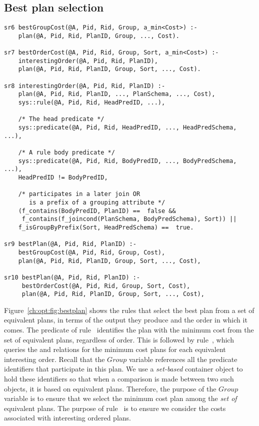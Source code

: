 \subsection{Best plan selection}
\label{ch:opt:sec:bestplan}

\begin{figure*}
\ssp
\centering
\begin{lstlisting}
sr6 bestGroupCost(@A, Pid, Rid, Group, a_min<Cost>) :-
    plan(@A, Pid, Rid, PlanID, Group, ..., Cost).

sr7 bestOrderCost(@A, Pid, Rid, Group, Sort, a_min<Cost>) :-
    interestingOrder(@A, Pid, Rid, PlanID),
    plan(@A, Pid, Rid, PlanID, Group, Sort, ..., Cost).

sr8 interestingOrder(@A, Pid, Rid, PlanID) :-
    plan(@A, Pid, Rid, PlanID, ..., PlanSchema, ..., Cost),
    sys::rule(@A, Pid, Rid, HeadPredID, ...),

    /* The head predicate */
    sys::predicate(@A, Pid, Rid, HeadPredID, ..., HeadPredSchema, ...),

    /* A rule body predicate */
    sys::predicate(@A, Pid, Rid, BodyPredID, ..., BodyPredSchema, ...),
    HeadPredID != BodyPredID,

    /* participates in a later join OR 
       is a prefix of a grouping attribute */
    (f_contains(BodyPredID, PlanID) ==  false && 
     f_contains(f_joincond(PlanSchema, BodyPredSchema), Sort)) ||
    f_isGroupByPrefix(Sort, HeadPredSchema) ==  true.

sr9 bestPlan(@A, Pid, Rid, PlanID) :-
    bestGroupCost(@A, Pid, Rid, Group, Cost),
    plan(@A, Pid, Rid, PlanID, Group, Sort, ..., Cost),

sr10 bestPlan(@A, Pid, Rid, PlanID) :-
     bestOrderCost(@A, Pid, Rid, Group, Sort, Cost),
     plan(@A, Pid, Rid, PlanID, Group, Sort, ..., Cost),
\end{lstlisting}
\caption{\label{ch:opt:fig:bestplan}Best plan selection.}
\end{figure*}

Figure~\ref{ch:opt:fig:bestplan} shows the rules that select the best plan from
a set of equivalent plans, in terms of the output they produce and the order in
which it comes.  The  predicate of rule~ identifies
the plan with the minimum cost from the set of equivalent plans, regardless of
order.  This is followed by rule~, which queries the  and
 relations for the minimum cost plans for each equivalent
interesting order.  Recall that the $Group$ variable references all the
predicate identifiers that participate in this plan.  We use a {\em set-based}
container object to hold these identifiers so that when a comparison is made
between two such objects, it is based on equivalent plans.  Therefore, the
purpose of the $Group$ variable is to ensure that we select the minimum cost
plan among the {\em set of} equivalent plans.  The purpose of rule~ is
to ensure we consider the costs associated with interesting ordered plans.

